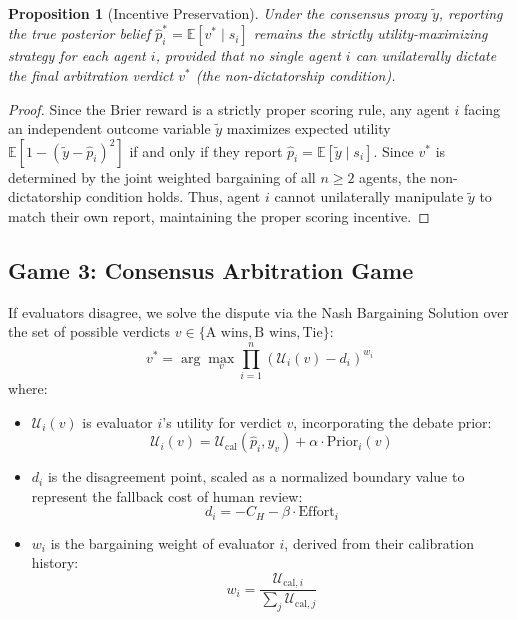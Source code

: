 \documentclass[11pt,a4paper]{article}
\newtheorem{proposition}{Proposition}
\begin{document}
\begin{proposition}[Incentive Preservation]
Under the consensus proxy $\tilde{y}$, reporting the true posterior belief $\hat{p}_i^* = \mathbb{E}[v^* \mid s_i]$ remains the strictly utility-maximizing strategy for each agent $i$, provided that no single agent $i$ can unilaterally dictate the final arbitration verdict $v^*$ (the non-dictatorship condition).
\end{proposition}
\begin{proof}
Since the Brier reward is a strictly proper scoring rule, any agent $i$ facing an independent outcome variable $\tilde{y}$ maximizes expected utility $\mathbb{E}[1 - (\tilde{y} - \hat{p}_i)^2]$ if and only if they report $\hat{p}_i = \mathbb{E}[\tilde{y} \mid s_i]$. Since $v^*$ is determined by the joint weighted bargaining of all $n \geq 2$ agents, the non-dictatorship condition holds. Thus, agent $i$ cannot unilaterally manipulate $\tilde{y}$ to match their own report, maintaining the proper scoring incentive.
\end{proof}

\subsection{Game 3: Consensus Arbitration Game}
If evaluators disagree, we solve the dispute via the Nash Bargaining Solution over the set of possible verdicts $v \in \{\text{A wins}, \text{B wins}, \text{Tie}\}$:
$$v^* = \arg\max_{v} \prod_{i=1}^n \left( \mathcal{U}_i(v) - d_i \right)^{w_i}$$
where:
\begin{itemize}
    \item $\mathcal{U}_i(v)$ is evaluator $i$'s utility for verdict $v$, incorporating the debate prior:
    $$\mathcal{U}_i(v) = \mathcal{U}_{\text{cal}}(\hat{p}_i, y_v) + \alpha \cdot \text{Prior}_i(v)$$
    \item $d_i$ is the disagreement point, scaled as a normalized boundary value to represent the fallback cost of human review:
    $$d_i = -C_H - \beta \cdot \text{Effort}_i$$
    \item $w_i$ is the bargaining weight of evaluator $i$, derived from their calibration history:
    $$w_i = \frac{\mathcal{U}_{\text{cal}, i}}{\sum_j \mathcal{U}_{\text{cal}, j}}$$
\end{itemize}
\end{document}
